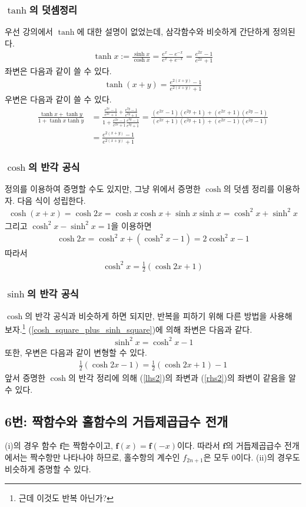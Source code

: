\subsubsection{$\tanh$의 덧셈정리}
우선 강의에서 $\tanh$에 대한 설명이 없었는데, 삼각함수와 비슷하게 간단하게 정의된다.
\begin{align*}
\tanh x:=\frac{\sinh x}{\cosh x}=\frac{e^x-e^{-x}}{e^x+e^{-x}}=\frac{e^{2x}-1}{e^{2x}+1}
\end{align*}
좌변은 다음과 같이 쓸 수 있다.
\begin{align*}
\tanh(x+y)=\frac{e^{2(x+y)}-1}{e^{2(x+y)}+1}
\end{align*}
우변은 다음과 같이 쓸 수 있다.
\begin{align*}
\frac{\tanh x+\tanh y}{1+\tanh x\tanh y}&=\frac{\frac{e^{2x}-1}{e^{2x}+1}+\frac{e^{2y}-1}{e^{2y}+1}}{1+\frac{e^{2x}-1}{e^{2x}+1}\frac{e^{2y}-1}{e^{2y}+1}}=\frac{(e^{2x}-1)(e^{2y}+1)+(e^{2x}+1)(e^{2y}-1)}{(e^{2x}+1)(e^{2y}+1)+(e^{2x}-1)(e^{2y}-1)}\\
&=\frac{e^{2(x+y)}-1}{e^{2(x+y)}+1}
\end{align*}

\subsubsection{$\cosh$의 반각 공식}
정의를 이용하여 증명할 수도 있지만, 그냥 위에서 증명한 $\cosh$의 덧셈 정리를 이용하자. 다음 식이 성립한다.
\begin{align*}
\cosh(x+x)=\cosh 2x=\cosh x\cosh x+\sinh x\sinh x=\cosh^2 x+\sinh^2 x
\end{align*}
그리고 $\cosh^2 x-\sinh^2 x=1$을 이용하면
\begin{align}\label{cosh_square_plus_sinh_square}
\cosh 2x=\cosh^2 x+(\cosh^2 x-1)=2\cosh^2 x-1
\end{align}
따라서
\begin{align*}
\cosh^2 x=\frac{1}{2}(\cosh 2x+1)
\end{align*}

\subsubsection{$\sinh$의 반각 공식}
$\cosh$의 반각 공식과 비슷하게 하면 되지만, 반복을 피하기 위해 다른 방법을 사용해 보자.\footnote{근데 이것도 반복 아닌가?} (\ref{cosh_square_plus_sinh_square})에 의해 좌변은 다음과 같다.
\begin{align}\label{lhs2}
\sinh^2 x=\cosh^2 x-1
\end{align}
또한, 우변은 다음과 같이 변형할 수 있다.
\begin{align}\label{rhs2}
\frac{1}{2}(\cosh 2x-1)=\frac{1}{2}(\cosh 2x+1)-1
\end{align}
앞서 증명한 $\cosh$의 반각 정리에 의해 (\ref{lhs2})의 좌변과 (\ref{rhs2})의 좌변이 같음을 알 수 있다.

\subsection{6번: 짝함수와 홀함수의 거듭제곱급수 전개}
(i)의 경우 함수 $\mathbf{f}$는 짝함수이고, $\mathbf{f}(x)=\mathbf{f}(-x)$이다. 따라서 $\mathbf{f}$의 거듭제곱급수 전개에서는 짝수항만 나타나야 하므로, 홀수항의 계수인 $f_{2n+1}$은 모두 0이다. (ii)의 경우도 비슷하게 증명할 수 있다. 
